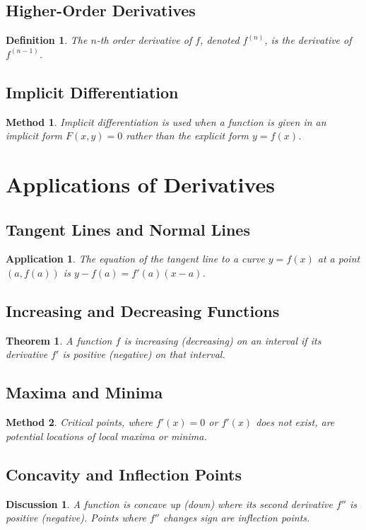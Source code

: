 \documentclass[a4paper,12pt]{book}
\newtheorem{theorem}{Theorem}
\newtheorem{application}{Application}
\newtheorem{definition}{Definition}
\newtheorem{method}{Method}
\newtheorem{discussion}{Discussion}
\begin{document}
\subsection{Higher-Order Derivatives}
\begin{definition}
The \( n \)-th order derivative of \( f \), denoted \( f^{(n)} \), is the derivative of \( f^{(n-1)} \).
\end{definition}

\subsection{Implicit Differentiation}
\begin{method}
Implicit differentiation is used when a function is given in an implicit form \( F(x, y) = 0 \) rather than the explicit form \( y = f(x) \).
\end{method}

\section{Applications of Derivatives}
\subsection{Tangent Lines and Normal Lines}
\begin{application}
The equation of the tangent line to a curve \( y = f(x) \) at a point \( (a, f(a)) \) is \( y - f(a) = f'(a)(x - a) \).
\end{application}

\subsection{Increasing and Decreasing Functions}
\begin{theorem}
A function \( f \) is increasing (decreasing) on an interval if its derivative \( f' \) is positive (negative) on that interval.
\end{theorem}

\subsection{Maxima and Minima}
\begin{method}
Critical points, where \( f'(x) = 0 \) or \( f'(x) \) does not exist, are potential locations of local maxima or minima.
\end{method}

\subsection{Concavity and Inflection Points}
\begin{discussion}
A function is concave up (down) where its second derivative \( f'' \) is positive (negative). Points where \( f'' \) changes sign are inflection points.
\end{discussion}
\end{document}
